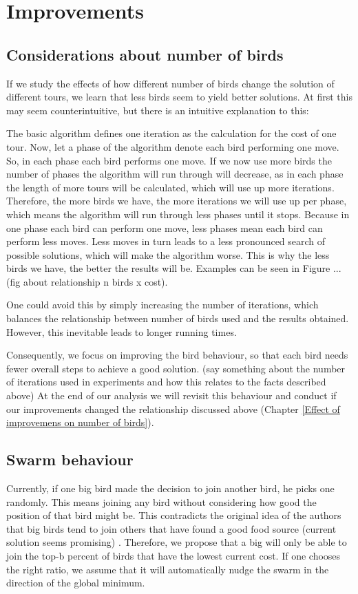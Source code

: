 \section{Improvements} \label{Improvements}
\subsection{Considerations about number of birds}
If we study the effects of how different number of birds change the solution of different tours, we learn that less birds seem to yield better solutions. At first this may seem counterintuitive, but there is an intuitive explanation to this:

The basic algorithm defines one iteration as the calculation for the cost of one tour. Now, let a phase of the algorithm denote each bird performing one move. So, in each phase each bird performs one move.
If we now use more birds the number of phases the algorithm will run through will decrease, as in each phase the length of more tours will be calculated, which will use up more iterations. Therefore, the more birds we have, the more iterations we will use up per phase, which means the algorithm will run through less phases until it stops. 
Because in one phase each bird can perform one move, less phases mean each bird can perform less moves. Less moves in turn leads to a less pronounced search of possible solutions, which will make the algorithm worse. This is why the less birds we have, the better the results will be.
Examples can be seen in Figure ... (fig about relationship n birds x cost).

One could avoid this by simply increasing the number of iterations, which balances the relationship between number of birds used and the results obtained. However, this inevitable leads to longer running times.

Consequently, we focus on improving the bird behaviour, so that each bird needs fewer overall steps to achieve a good solution.
(say something about the number of iterations used in experiments and how this relates to the facts described above)
At the end of our analysis we will revisit this behaviour and conduct if our improvements changed the relationship discussed above (Chapter \ref{Effect of improvemens on number of birds}).

\subsection{Swarm behaviour}
Currently, if one big bird made the decision to join another bird, he picks one randomly.
This means joining any bird without considering how good the position of that bird might be. This contradicts the original idea of the authors that big birds tend to join others that have found a good food source (current solution seems promising) \cite{afb}.
Therefore, we propose that a big will only be able to join the top-b percent of birds that have the lowest current cost. If one chooses the right ratio, we assume that it will automatically nudge the swarm in the direction of the global minimum.

